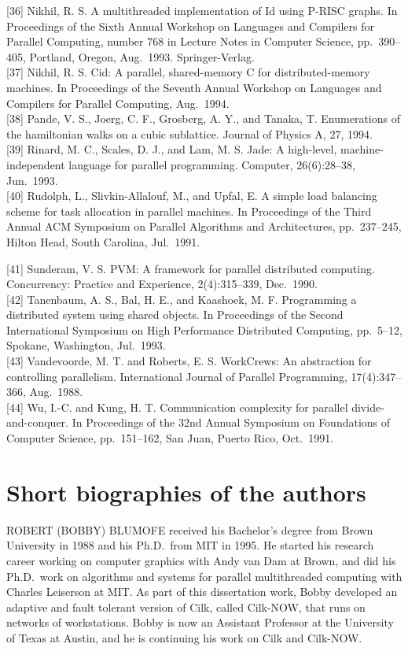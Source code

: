 \documentclass[
]{article}
\begin{document}
{[}36{]} Nikhil, R. S. A multithreaded implementation of Id using P-RISC
graphs. In Proceedings of the Sixth Annual Workshop on Languages and
Compilers for Parallel Computing, number 768 in Lecture Notes in
Computer Science, pp.~390--405, Portland, Oregon, Aug.~1993.
Springer-Verlag.\\
{[}37{]} Nikhil, R. S. Cid: A parallel, shared-memory C for
distributed-memory machines. In Proceedings of the Seventh Annual
Workshop on Languages and Compilers for Parallel Computing, Aug.~1994.\\
{[}38{]} Pande, V. S., Joerg, C. F., Grosberg, A. Y., and Tanaka, T.
Enumerations of the hamiltonian walks on a cubic sublattice. Journal of
Physics A, 27, 1994.\\
{[}39{]} Rinard, M. C., Scales, D. J., and Lam, M. S. Jade: A
high-level, machine-independent language for parallel programming.
Computer, 26(6):28--38, Jun.~1993.\\
{[}40{]} Rudolph, L., Slivkin-Allalouf, M., and Upfal, E. A simple load
balancing scheme for task allocation in parallel machines. In
Proceedings of the Third Annual ACM Symposium on Parallel Algorithms and
Architectures, pp.~237--245, Hilton Head, South Carolina, Jul.~1991.

{[}41{]} Sunderam, V. S. PVM: A framework for parallel distributed
computing. Concurrency: Practice and Experience, 2(4):315--339,
Dec.~1990.\\
{[}42{]} Tanenbaum, A. S., Bal, H. E., and Kaashoek, M. F. Programming a
distributed system using shared objects. In Proceedings of the Second
International Symposium on High Performance Distributed Computing,
pp.~5--12, Spokane, Washington, Jul.~1993.\\
{[}43{]} Vandevoorde, M. T. and Roberts, E. S. WorkCrews: An abstraction
for controlling parallelism. International Journal of Parallel
Programming, 17(4):347--366, Aug.~1988.\\
{[}44{]} Wu, I.-C. and Kung, H. T. Communication complexity for parallel
divide-and-conquer. In Proceedings of the 32nd Annual Symposium on
Foundations of Computer Science, pp.~151--162, San Juan, Puerto Rico,
Oct.~1991.

\section{Short biographies of the
authors}\label{short-biographies-of-the-authors}

ROBERT (BOBBY) BLUMOFE received his Bachelor's degree from Brown
University in 1988 and his Ph.D.~from MIT in 1995. He started his
research career working on computer graphics with Andy van Dam at Brown,
and did his Ph.D.~work on algorithms and systems for parallel
multithreaded computing with Charles Leiserson at MIT. As part of this
dissertation work, Bobby developed an adaptive and fault tolerant
version of Cilk, called Cilk-NOW, that runs on networks of workstations.
Bobby is now an Assistant Professor at the University of Texas at
Austin, and he is continuing his work on Cilk and Cilk-NOW.
\end{document}
